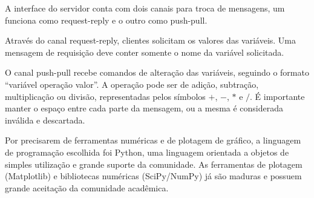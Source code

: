 A interface do servidor conta com dois canais para troca de mensagens,
um funciona como request-reply e o outro como push-pull.

Através do canal request-reply, clientes solicitam os valores das
variáveis. Uma mensagem de requisição deve conter somente o nome da
variável solicitada.

O canal push-pull recebe comandos de alteração das variáveis, seguindo
o formato ``variável operação valor''. A operação pode ser de adição,
subtração, multiplicação ou divisão, representadas pelos símbolos $+$,
$-$, $*$ e $/$. É importante manter o espaço entre cada parte da
mensagem, ou a mesma é considerada inválida e descartada.

Por precisarem de ferramentas numéricas e de plotagem de gráfico, a
linguagem de programação escolhida foi Python, uma linguagem orientada
a objetos de simples utilização e grande suporte da comunidade. As
ferramentas de plotagem (Matplotlib) e bibliotecas numéricas
(SciPy/NumPy) já são maduras e possuem grande aceitação da comunidade
acadêmica.
